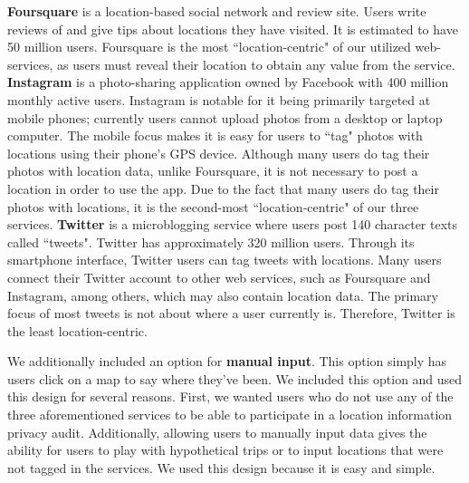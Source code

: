 \textbf{Foursquare} is a location-based social network and review site. 
Users write reviews of and give tips about locations they have visited. 
It is estimated to have 50 million users. 
Foursquare is the most ``location-centric" of our utilized web-services, as users must reveal their location to obtain any value from the service.
\textbf{Instagram} is a photo-sharing application owned by Facebook with 400 million monthly active users. 
Instagram is notable for it being primarily targeted at mobile phones; currently users cannot upload photos from a desktop or laptop computer.
The mobile focus makes it is easy for users to ``tag" photos with locations using their phone's GPS device. 
Although many users do tag their photos with location data, unlike Foursquare, it is not necessary to post a location in order to use the app.
Due to the fact that many users do tag their photos with locations, it is the second-most ``location-centric" of our three services.
\textbf{Twitter} is a microblogging service where users post 140 character texts called ``tweets". Twitter has approximately 320 million users. Through its smartphone interface, Twitter users can tag tweets with locations. Many users connect their Twitter account to other web services, such as Foursquare and Instagram, among others, which may also contain location data. The primary focus of most tweets is not about where a user currently is. Therefore, Twitter is the least location-centric. 

We additionally included an option for \textbf{manual input}. 
This option simply has users click on a map to say where they've been. 
We included this option and used this design for several reasons. 
First, we wanted users who do not use any of the three aforementioned services to be able to participate in a location information privacy audit. 
Additionally, allowing users to manually input data gives the ability for users to play with hypothetical trips or to input locations that were not tagged in the services. 
We used this design because it is easy and simple.


